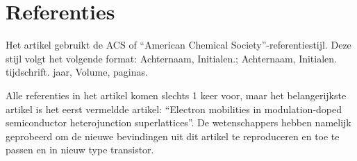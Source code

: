 \documentclass[11pt]{article}
\begin{document}
\section{Referenties}
Het artikel gebruikt de ACS of ``American Chemical Society''-referentiestijl. Deze stijl volgt het volgende format: Achternaam, Initialen.; Achternaam, Initialen. tijdschrift. jaar, Volume, paginas. 

Alle referenties in het artikel komen slechts 1 keer voor, maar het belangerijkste artikel is het eerst vermeldde artikel: ``Electron mobilities in modulation-doped semiconductor heterojunction superlattices''. De wetenschappers hebben namelijk geprobeerd om de nieuwe bevindingen uit dit artikel te reproduceren en toe te passen en in nieuw type transistor.

%
%

\appendix




\end{document}
